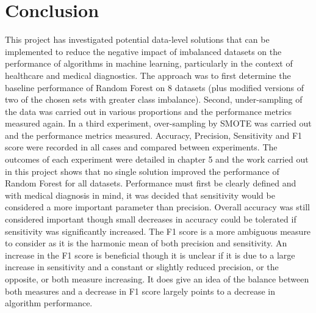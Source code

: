 \chapter{Conclusion}\label{ch:Conclusion}
This project has investigated potential data-level solutions that can be implemented to reduce the negative impact of imbalanced datasets on the performance of algorithms in machine learning, particularly in the context of healthcare and medical diagnostics.\newline
The approach was to first determine the baseline performance of Random Forest on 8 datasets (plus modified versions of two of the chosen sets with greater class imbalance). Second, under-sampling of the data was carried out in various proportions and the performance metrics measured again. In a third experiment, over-sampling by SMOTE was carried out and the performance metrics measured. Accuracy, Precision, Sensitivity and F1 score were recorded in all cases and compared between experiments.
The outcomes of each experiment were detailed in chapter 5 and the work carried out in this project shows that no single solution improved the performance of Random Forest for all datasets.\newline
Performance must first be clearly defined and with medical diagnosis in mind, it was decided that sensitivity would be considered a more important parameter than precision. Overall accuracy was still considered important though small decreases in accuracy could be tolerated if sensitivity was significantly increased. The F1 score is a more ambiguous measure to consider as it is the harmonic mean of both precision and sensitivity. An increase in the F1 score is beneficial though it is unclear if it is due to a large increase in sensitivity and a constant or slightly reduced precision, or the opposite, or both measure increasing. It does give an idea of the balance between both measures and a decrease in F1 score largely points to a decrease in algorithm performance.\newline

